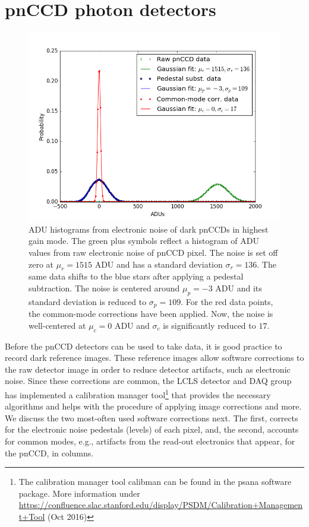 \section{pnCCD photon detectors}\label{sec:pnccd-corr}
\begin{figure}
	\centering
		\includegraphics[height=0.50\textwidth]{images/pnCCD-electronic-noise.png}
	\caption[ADU histograms from electronic noise of dark pnCCDs.]{ADU histograms from electronic noise of dark pnCCDs in highest gain mode. The green plus symbols reflect a histogram of ADU values from raw electronic noise of pnCCD pixel. The noise is set off zero at $\mu_{r}=1515$ ADU and has a standard deviation $\sigma_{r}=136$. The same data shifts to the blue stars after applying a pedestal subtraction. The noise is centered around $\mu_{p}=-3$ ADU and its standard deviation is reduced to $\sigma_{p}=109$. For the red data points, the common-mode corrections have been applied. Now, the noise is well-centered at $\mu_{c}=0$ ADU and $\sigma_{c}$ is significantly reduced to $17$.}
	\label{fig:pnCCD-electronic-noise}
\end{figure}
Before the pnCCD detectors can be used to take data, it is good practice to record dark reference images. These reference images allow software corrections to the raw detector image in order to reduce detector artifacts, such as electronic noise. Since these corrections are common, the LCLS detector and DAQ group has implemented a calibration manager tool\footnote{The calibration manager tool calibman can be found in the psana software package. More information under \url{https://confluence.slac.stanford.edu/display/PSDM/Calibration+Management+Tool} (Oct 2016)} that provides the necessary algorithms and helps with the procedure of applying image corrections and more. We discuss the two most-often used software corrections next. The first, corrects for the electronic noise pedestals (levels) of each pixel, and, the second, accounts for common modes, e.g., artifacts from the read-out electronics that appear, for the pnCCD, in columns.\\[1\baselineskip]
